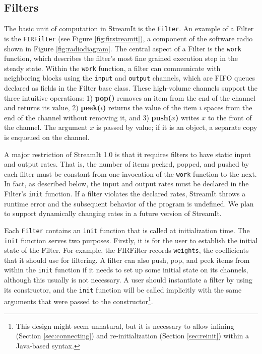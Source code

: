 \subsection{Filters}

The basic unit of computation in StreamIt is the {\tt Filter}.  An
example of a Filter is the {\tt FIRFilter} (see Figure
\ref{fig:firstreamit}), a component of the software radio shown in
Figure \ref{fig:radiodiagram}.  The central aspect of a Filter is the
{\tt work} function, which describes the filter's most fine grained
execution step in the steady state.  Within the {\tt work} function, a
filter can communicate with neighboring blocks using the {\tt input}
and {\tt output} channels, which are FIFO queues declared as fields in
the Filter base class.  These high-volume channels support the three
intuitive operations: 1) {\bf pop()} removes an item from the end of
the channel and returns its value, 2) {\bf peek($i$)} returns the
value of the item $i$ spaces from the end of the channel without
removing it, and 3) {\bf push($x$)} writes $x$ to the front of the
channel.  The argument $x$ is passed by value; if it is an object, a
separate copy is enqueued on the channel.

A major restriction of StreamIt 1.0 is that it requires filters to
have static input and output rates.  That is, the number of items
peeked, popped, and pushed by each filter must be constant from one
invocation of the {\tt work} function to the next.  In fact, as
described below, the input and output rates must be declared in the
Filter's {\tt init} function.  If a filter violates the declared
rates, StreamIt throws a runtime error and the subsequent behavior of
the program is undefined. We plan to support dynamically changing
rates in a future version of StreamIt.

Each {\tt Filter} contains an {\tt init} function that is called at
initialization time.  The {\tt init} function serves two purposes.
Firstly, it is for the user to establish the initial state of the
Filter.  For example, the FIRFilter records {\tt weights}, the
coefficients that it should use for filtering.  A filter can also
push, pop, and peek items from within the {\tt init} function if it
needs to set up some initial state on its channels, although this
usually is not necessary.  A user should instantiate a filter by using
its constructor, and the {\tt init} function will be called implicitly
with the same arguments that were passed to the
constructor{\footnote{This design might seem unnatural, but it is
necessary to allow inlining (Section
\ref{sec:connecting}) and re-initialization (Section \ref{sec:reinit})
within a Java-based syntax.}}.

